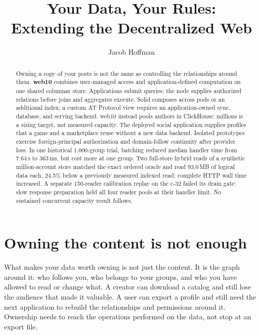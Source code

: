 \documentclass[sigconf, nonacm]{acmart}
\title{Your Data, Your Rules: \\ Extending the Decentralized Web}
\author{Jacob Hoffman}
\affiliation{\institution{Independent}\country{}}
\begin{document}
\begin{abstract}
Owning a copy of your posts is not the same as controlling the
relationships around them. \textbf{web10} combines user-managed access
and application-defined computation on one shared columnar store.
Applications submit queries; the node supplies authorized relations
before joins and aggregates execute. Solid composes across pods or an
additional index; a custom AT Protocol view requires an application-owned
sync, database, and serving backend. web10 instead pools authors in
ClickHouse: millions is a sizing target, not measured capacity.
The deployed social application supplies profiles that a game and a
marketplace reuse without a new data backend. Isolated prototypes exercise
foreign-principal authorization and domain-follow continuity after provider
loss. In one historical 1,000-group trial, batching reduced median handler
time from 7.64\,s to 363\,ms, but cost more at one group. Two full-store
hybrid reads of a synthetic million-account store matched the exact ordered
oracle and read 93.0\,MB of logical data each, 24.5\% below a previously
measured indexed read; complete HTTP wall time increased. A separate
150-reader calibration replay on the c-32 failed its drain gate: slow
response preparation held all four reader pools at their handler limit.
No sustained concurrent capacity result follows.
\end{abstract}
\maketitle

\section{Owning the content is not enough}
\label{sec:intro}

What makes your data worth owning is not just the content. It is the
graph around it: who follows you, who belongs to your groups, and who
you have allowed to read or change what. A creator can download a
catalog and still lose the audience that made it valuable. A user can
export a profile and still need the next application to rebuild the
relationships and permissions around it. Ownership needs to reach the
operations performed on the data, not stop at an export file.
\end{document}

